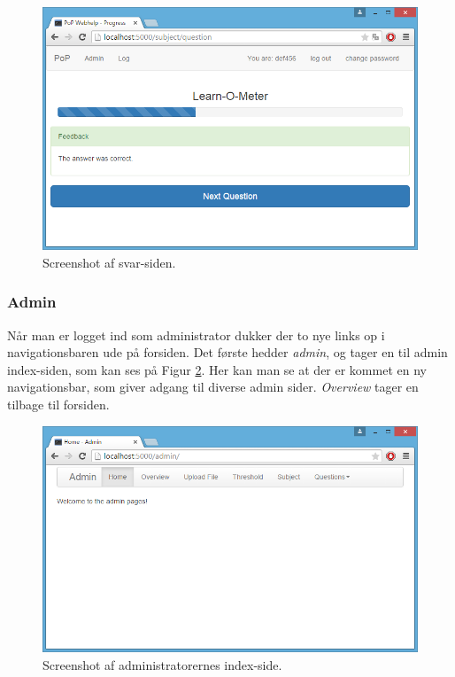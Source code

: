 \documentclass[11pt, a4paper]{article}
\begin{document}
\begin{figure}[htpb]
    \centering
    \includegraphics[width=1\linewidth]{figures/interface/answer.png}
    \caption{Screenshot af svar-siden.}
    \label{fig:screenshot_answer}
\end{figure}

\FloatBarrier

\subsubsection{Admin}
\label{subsub:screenshots_admin}
Når man er logget ind som administrator dukker der to nye links op i navigationsbaren ude på forsiden. Det første hedder \emph{admin}, og tager en til admin index-siden, som kan ses på Figur \ref{fig:screenshot_admin_home}. Her kan man se at der er kommet en ny navigationsbar, som giver adgang til diverse admin sider. \emph{Overview} tager en tilbage til forsiden.

\begin{figure}[htpb]
    \centering
    \includegraphics[width=1\linewidth]{figures/interface/admin_home.png}
    \caption{Screenshot af administratorernes index-side.}
    \label{fig:screenshot_admin_home}
\end{figure}
\end{document}
